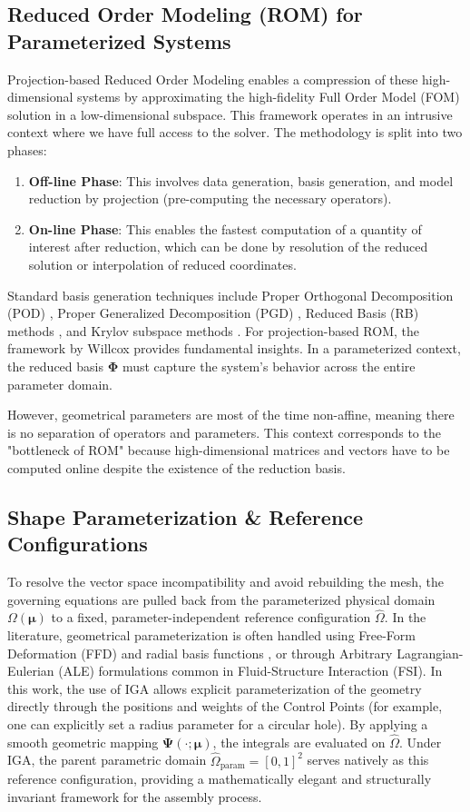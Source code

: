 \subsection{Reduced Order Modeling (ROM) for Parameterized Systems}
Projection-based Reduced Order Modeling enables a compression of these high-dimensional systems by approximating the high-fidelity Full Order Model (FOM) solution in a low-dimensional subspace. This framework operates in an intrusive context where we have full access to the solver. The methodology is split into two phases:
\begin{enumerate}
    \item \textbf{Off-line Phase}: This involves data generation, basis generation, and model reduction by projection (pre-computing the necessary operators).
    \item \textbf{On-line Phase}: This enables the fastest computation of a quantity of interest after reduction, which can be done by resolution of the reduced solution or interpolation of reduced coordinates.
\end{enumerate}
Standard basis generation techniques include Proper Orthogonal Decomposition (POD) \cite{berkooz1993}, Proper Generalized Decomposition (PGD) \cite{chinesta2011}, Reduced Basis (RB) methods \cite{rozza2008}, and Krylov subspace methods \cite{rutzmoser2017}. For projection-based ROM, the framework by Willcox \cite{willcox2002} provides fundamental insights. In a parameterized context, the reduced basis $\boldsymbol{\Phi}$ must capture the system's behavior across the entire parameter domain.

However, geometrical parameters are most of the time non-affine, meaning there is no separation of operators and parameters. This context corresponds to the "bottleneck of ROM" because high-dimensional matrices and vectors have to be computed online despite the existence of the reduction basis.

\subsection{Shape Parameterization \& Reference Configurations}
To resolve the vector space incompatibility and avoid rebuilding the mesh, the governing equations are pulled back from the parameterized physical domain $\Omega(\boldsymbol{\mu})$ to a fixed, parameter-independent reference configuration $\hat{\Omega}$. In the literature, geometrical parameterization is often handled using Free-Form Deformation (FFD) and radial basis functions \cite{rozza2008, ballarin2015}, or through Arbitrary Lagrangian-Eulerian (ALE) formulations common in Fluid-Structure Interaction (FSI). In this work, the use of IGA allows explicit parameterization of the geometry directly through the positions and weights of the Control Points (for example, one can explicitly set a radius parameter for a circular hole). By applying a smooth geometric mapping $\boldsymbol{\Psi}(\cdot; \boldsymbol{\mu})$, the integrals are evaluated on $\hat{\Omega}$. Under IGA, the parent parametric domain $\hat{\Omega}_{\text{param}} = [0, 1]^2$ serves natively as this reference configuration, providing a mathematically elegant and structurally invariant framework for the assembly process.

